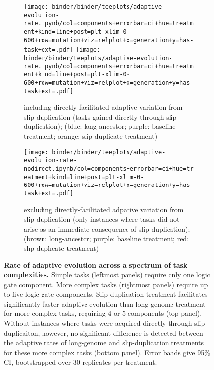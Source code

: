 \begin{figure*}
    \centering
    \begin{subfigure}{\textwidth}
    \texttt{[image: binder/binder/teeplots/adaptive-evolution-rate.ipynb/col=components+errorbar=ci+hue=treatment+kind=line+post=plt-xlim-0-600+row=mutation+viz=relplot+x=generation+y=has-task+ext=.pdf]}
\texttt{[image: binder/binder/teeplots/adaptive-evolution-rate.ipynb/col=components+errorbar=ci+hue=treatment+kind=line+post=plt-xlim-0-600+row=mutation+viz=relplot+x=generation+y=has-task+ext=.pdf]}
    \caption{\footnotesize including directly-facilitated adaptive variation from slip duplication (tasks gained directly through slip duplication); (blue: long-ancestor; purple: baseline treatment; orange: slip-duplicate treatment)}
    \end{subfigure}

    \begin{subfigure}{\textwidth}
\texttt{[image: binder/binder/teeplots/adaptive-evolution-rate-nodirect.ipynb/col=components+errorbar=ci+hue=treatment+kind=line+post=plt-xlim-0-600+row=mutation+viz=relplot+x=generation+y=has-task+ext=.pdf]}
    \caption{\footnotesize excluding directly-facilitated adpative variation from slip duplication (only instances where tasks did not arise as an immediate consequence of slip duplication); (brown: long-ancestor; purple: baseline treatment; red: slip-duplicate treatment)}
    \end{subfigure}
    \caption{
        \textbf{Rate of adaptive evolution across a spectrum of task complexities.}
        \footnotesize
        Simple tasks (leftmost panels) require only one logic gate component.
        More complex tasks (rightmost panels) require up to five logic gate components.
        Slip-duplication treatment facilitates significantly faster adaptive evolution than long-genome treatment for more complex tasks, requiring 4 or 5 components (top panel).
        Without instances where tasks were acquired directly through slip duplicaiton, however, no significant difference is detected between the adaptive rates of long-genome and slip-duplication treatments for these more complex tasks (bottom panel).
        Error bands give 95\% CI, bootstrapped over 30 replicates per treatment.
    }
    \label{fig:adaptive-evolution-rate}
\end{figure*}

